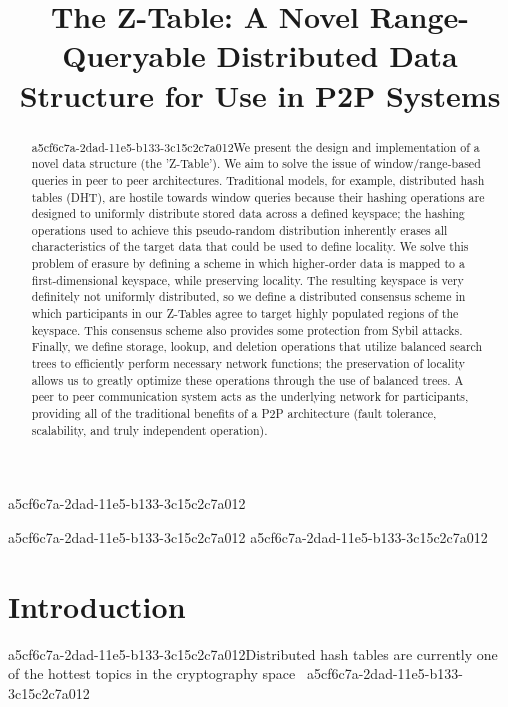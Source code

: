 \documentclass[12pt]{article}
\title{The Z-Table: A Novel Range-Queryable Distributed Data Structure for Use in P2P Systems}
\begin{document}
a5cf6c7a-2dad-11e5-b133-3c15c2c7a012\maketitle
a5cf6c7a-2dad-11e5-b133-3c15c2c7a012
a5cf6c7a-2dad-11e5-b133-3c15c2c7a012\begin{abstract}
a5cf6c7a-2dad-11e5-b133-3c15c2c7a012We present the design and implementation of a novel data structure (the 'Z-Table'). We aim to solve the issue of window/range-based queries in peer to peer architectures. Traditional models, for example,  distributed hash tables (DHT), are hostile towards window queries because their hashing operations are designed to uniformly distribute stored data across a defined keyspace; the hashing operations used to achieve this pseudo-random distribution inherently erases all characteristics of the target data that could be used to define locality. We solve this problem of erasure by defining a scheme in which higher-order data is mapped to a first-dimensional keyspace, while preserving locality. The resulting keyspace is very definitely not uniformly distributed, so we define a distributed consensus scheme in which participants in our Z-Tables agree to target highly populated regions of the keyspace. This consensus scheme also provides some protection from Sybil attacks. Finally, we define storage, lookup, and deletion operations that utilize balanced search trees to efficiently perform necessary network functions; the preservation of locality allows us to greatly optimize these operations through the use of balanced trees. A peer to peer communication system acts as the underlying network for participants, providing all of the traditional benefits of a P2P architecture (fault tolerance, scalability, and truly independent operation).
\end{abstract}


\newpage
\section{Introduction}
a5cf6c7a-2dad-11e5-b133-3c15c2c7a012Distributed hash tables are currently one of the hottest topics in the cryptography space~\cite{Stoica:2001dj,Rowstron:2001ea,Ratnasamy:2001wn}
a5cf6c7a-2dad-11e5-b133-3c15c2c7a012
\printbibliography
\end{document}
